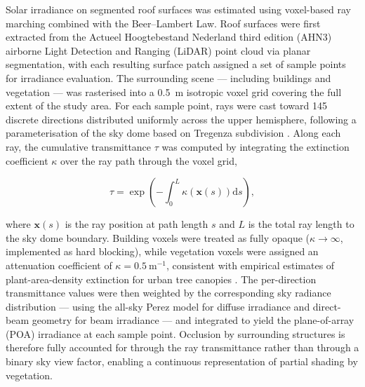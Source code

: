 Solar irradiance on segmented roof surfaces was estimated using voxel-based ray marching
combined with the Beer--Lambert Law. Roof surfaces were first extracted from the Actueel
Hoogtebestand Nederland third edition (AHN3) airborne Light Detection and Ranging (LiDAR)
point cloud via planar segmentation, with each resulting surface patch assigned a set of
sample points for irradiance evaluation. The surrounding scene --- including buildings and
vegetation --- was rasterised into a 0.5~m isotropic voxel grid covering the full extent
of the study area. For each sample point, rays were cast toward 145 discrete directions
distributed uniformly across the upper hemisphere, following a parameterisation of the sky
dome based on Tregenza subdivision \citep{Tregenza1983}. Along each ray, the cumulative
transmittance $\tau$ was computed by integrating the extinction coefficient $\kappa$ over
the ray path through the voxel grid,

\begin{equation}
    \tau = \exp\!\left(-\int_0^{L} \kappa\!\left(\mathbf{x}(s)\right)\mathrm{d}s\right),
    \label{eq:beer-lambert}
\end{equation}

\noindent where $\mathbf{x}(s)$ is the ray position at path length $s$ and $L$ is the
total ray length to the sky dome boundary. Building voxels were treated as fully opaque
($\kappa \to \infty$, implemented as hard blocking), while vegetation voxels were assigned
an attenuation coefficient of $\kappa = 0.5~\mathrm{m}^{-1}$, consistent with empirical
estimates of plant-area-density extinction for urban tree canopies
\citep{Jonckheere2004,Widlowski2006}. The per-direction transmittance values were then
weighted by the corresponding sky radiance distribution --- using the all-sky Perez model
for diffuse irradiance and direct-beam geometry for beam irradiance --- and integrated to
yield the plane-of-array (POA) irradiance at each sample point. Occlusion by surrounding
structures is therefore fully accounted for through the ray transmittance rather than
through a binary sky view factor, enabling a continuous representation of partial shading
by vegetation.
